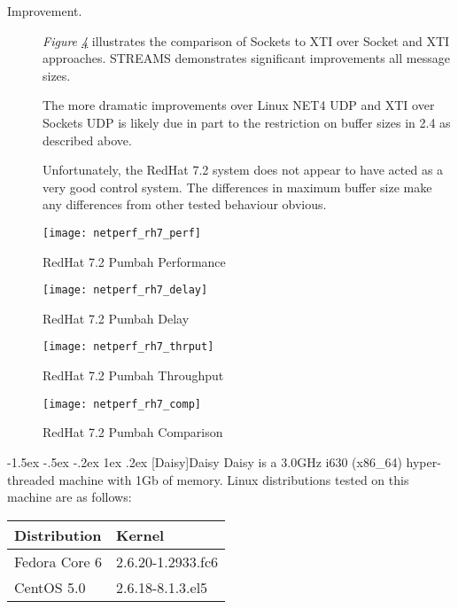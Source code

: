 \documentclass[letterpaper,final,notitlepage,twocolumn,10pt,twoside]{article}
\makeatletter
\renewcommand\subsection{\@startsection{subsection}{2}{\z@}%
                                     {-1.5ex \@plus -.5ex \@minus -.2ex}%
                                     {1ex \@plus .2ex}%
                                     {\normalfont\normalsize\bfseries}}
\makeatother
\begin{document}
\begin{description}
\item[Improvement.]

\textit{Figure \ref{figure:rh7comp}}
illustrates
the comparison of Sockets to XTI over Socket and XTI approaches.  STREAMS
demonstrates significant improvements all message sizes.

The more dramatic improvements over Linux NET4 UDP and XTI over Sockets UDP is
likely due in part to the restriction on buffer sizes in 2.4 as described
above.

Unfortunately, the RedHat 7.2 system does not appear to have acted as a very
good control system.  The differences in maximum buffer size make any
differences from other tested behaviour obvious.

\end{description}

\begin{figure}[p]
\center\texttt{[image: netperf\_rh7\_perf]}
\caption[RedHat 7.2 Pumbah Performance]{RedHat 7.2 Pumbah Performance}
\label{figure:rh7perf}
\end{figure}

\begin{figure}[p]
\center\texttt{[image: netperf\_rh7\_delay]}
\caption[RedHat 7.2 Pumbah Delay]{RedHat 7.2 Pumbah Delay}
\label{figure:rh7dly}
\end{figure}

\begin{figure}[p]
\center\texttt{[image: netperf\_rh7\_thrput]}
\caption[RedHat 7.2 Pumbah Throughput]{RedHat 7.2 Pumbah Throughput}
\label{figure:rh7thrput}
\end{figure}

\begin{figure}[p]
\center\texttt{[image: netperf\_rh7\_comp]}
\caption[RedHat 7.2 Pumbah Comparison]{RedHat 7.2 Pumbah Comparison}
\label{figure:rh7comp}
\end{figure}

\subsection[Daisy]{Daisy}
Daisy is a 3.0GHz i630 (x86\_64) hyper-threaded machine with 1Gb of memory.
Linux distributions tested on this machine are as follows:

\begin{tabular}{ll}\\
Distribution & Kernel\\
\hline
Fedora Core 6 & 2.6.20-1.2933.fc6\\
CentOS 5.0 & 2.6.18-8.1.3.el5\\
\end{tabular}\\[1.0ex]
\end{document}
